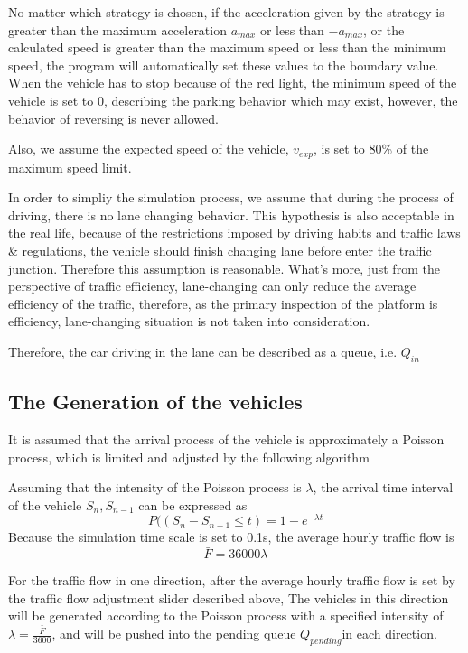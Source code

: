 \documentclass[a4paper]{paper}
\begin{document}
No matter which strategy is chosen, if the acceleration given by the strategy is greater than the maximum acceleration $a_{max}$ or less than $-a_{max}$, or the calculated speed is greater than the maximum speed or less than the minimum speed, the program will automatically set these values to the boundary value. When the vehicle has to stop because of the red light, the minimum speed of the vehicle is set to 0, describing the parking behavior which may exist, however, the behavior of reversing is never allowed.

Also, we assume the expected speed of the vehicle, $v_{exp}$, is set to 80\% of the maximum speed limit.

In order to simpliy the simulation process, we assume that during the process of driving, there is no lane changing behavior. This hypothesis is also acceptable in the real life, because of the restrictions imposed by driving habits and traffic laws \& regulations, the vehicle should finish changing lane before enter the traffic junction. Therefore this assumption is reasonable. What's more, just from the perspective of traffic efficiency, lane-changing can only reduce the average efficiency of the traffic, therefore, as the primary inspection of the platform is efficiency, lane-changing situation is not taken into consideration.

Therefore, the car driving in the lane can be described as a queue, i.e. $Q_{in}$

\subsection{The Generation of the vehicles}
It is assumed that the arrival process of the vehicle is approximately a Poisson process, which is limited and adjusted by the following algorithm

Assuming that the intensity of the Poisson process is $\lambda$, the arrival time interval of the vehicle $S_n,S_{n-1}$ can be expressed as 
$$P((S_n-S_{n-1}\le t) = 1 - e^{-\lambda t}$$
Because the simulation time scale is set to 0.1s, the average hourly traffic flow is $$\bar{F}=36000\lambda$$

For the traffic flow in one direction, after the average hourly traffic flow is set by the traffic flow adjustment slider described above, The vehicles in this direction will be generated according to the Poisson process with a specified intensity of $\lambda=\displaystyle{\frac{\bar{F}}{3600}}$, and will be pushed into the pending queue $Q_{pending}$in each direction.
\end{document}
